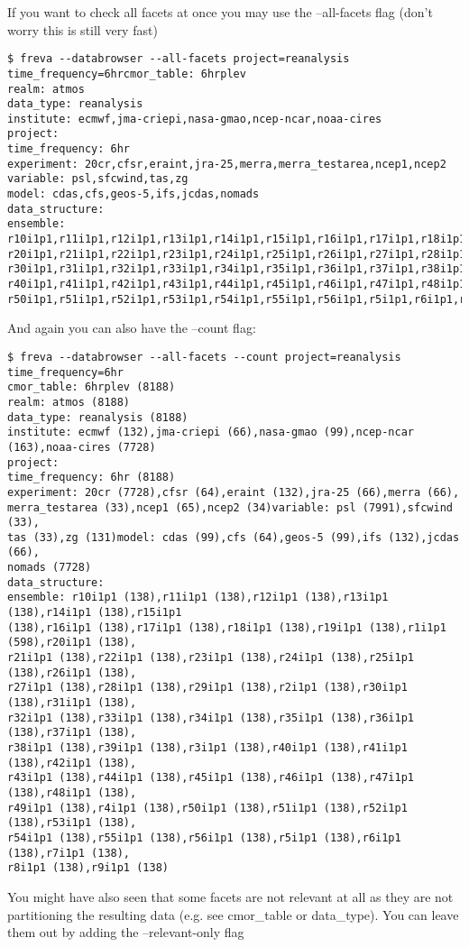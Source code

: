 \documentclass[a4paper,11pt]{ltxdoc}
\begin{document}
If you want to check all facets at once you may use the --all-facets flag (don't worry this is still very fast)
\begin{verbatim}
$ freva --databrowser --all-facets project=reanalysis 
time_frequency=6hrcmor_table: 6hrplev
realm: atmos
data_type: reanalysis
institute: ecmwf,jma-criepi,nasa-gmao,ncep-ncar,noaa-cires
project: 
time_frequency: 6hr
experiment: 20cr,cfsr,eraint,jra-25,merra,merra_testarea,ncep1,ncep2
variable: psl,sfcwind,tas,zg
model: cdas,cfs,geos-5,ifs,jcdas,nomads
data_structure: 
ensemble: 
r10i1p1,r11i1p1,r12i1p1,r13i1p1,r14i1p1,r15i1p1,r16i1p1,r17i1p1,r18i1p1,r19i1p1,r1i1p1,
r20i1p1,r21i1p1,r22i1p1,r23i1p1,r24i1p1,r25i1p1,r26i1p1,r27i1p1,r28i1p1,r29i1p1,r2i1p1,
r30i1p1,r31i1p1,r32i1p1,r33i1p1,r34i1p1,r35i1p1,r36i1p1,r37i1p1,r38i1p1,r39i1p1,r3i1p1,
r40i1p1,r41i1p1,r42i1p1,r43i1p1,r44i1p1,r45i1p1,r46i1p1,r47i1p1,r48i1p1,r49i1p1,r4i1p1,
r50i1p1,r51i1p1,r52i1p1,r53i1p1,r54i1p1,r55i1p1,r56i1p1,r5i1p1,r6i1p1,r7i1p1,r8i1p1,r9i1p1
\end{verbatim}
And again you can also have the --count flag:
\begin{verbatim}
$ freva --databrowser --all-facets --count project=reanalysis time_frequency=6hr
cmor_table: 6hrplev (8188)
realm: atmos (8188)
data_type: reanalysis (8188)
institute: ecmwf (132),jma-criepi (66),nasa-gmao (99),ncep-ncar (163),noaa-cires (7728)
project: 
time_frequency: 6hr (8188)
experiment: 20cr (7728),cfsr (64),eraint (132),jra-25 (66),merra (66),
merra_testarea (33),ncep1 (65),ncep2 (34)variable: psl (7991),sfcwind (33),
tas (33),zg (131)model: cdas (99),cfs (64),geos-5 (99),ifs (132),jcdas (66),
nomads (7728)
data_structure: 
ensemble: r10i1p1 (138),r11i1p1 (138),r12i1p1 (138),r13i1p1 (138),r14i1p1 (138),r15i1p1 
(138),r16i1p1 (138),r17i1p1 (138),r18i1p1 (138),r19i1p1 (138),r1i1p1 (598),r20i1p1 (138),
r21i1p1 (138),r22i1p1 (138),r23i1p1 (138),r24i1p1 (138),r25i1p1 (138),r26i1p1 (138),
r27i1p1 (138),r28i1p1 (138),r29i1p1 (138),r2i1p1 (138),r30i1p1 (138),r31i1p1 (138),
r32i1p1 (138),r33i1p1 (138),r34i1p1 (138),r35i1p1 (138),r36i1p1 (138),r37i1p1 (138),
r38i1p1 (138),r39i1p1 (138),r3i1p1 (138),r40i1p1 (138),r41i1p1 (138),r42i1p1 (138),
r43i1p1 (138),r44i1p1 (138),r45i1p1 (138),r46i1p1 (138),r47i1p1 (138),r48i1p1 (138),
r49i1p1 (138),r4i1p1 (138),r50i1p1 (138),r51i1p1 (138),r52i1p1 (138),r53i1p1 (138),
r54i1p1 (138),r55i1p1 (138),r56i1p1 (138),r5i1p1 (138),r6i1p1 (138),r7i1p1 (138),
r8i1p1 (138),r9i1p1 (138)
\end{verbatim}
You might have also seen that some facets are not relevant at all as they are not partitioning the resulting data (e.g. see cmor\_table or data\_type). You can leave them out by adding the --relevant-only flag
\end{document}
